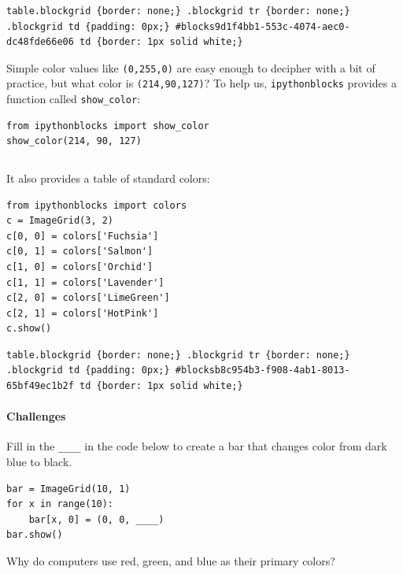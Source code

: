 \documentclass{book}
\begin{document}
\begin{verbatim}
table.blockgrid {border: none;} .blockgrid tr {border: none;} .blockgrid td {padding: 0px;} #blocks9d1f4bb1-553c-4074-aec0-dc48fde66e06 td {border: 1px solid white;}
\end{verbatim}

Simple color values like \texttt{(0,255,0)} are easy enough to decipher
with a bit of practice, but what color is \texttt{(214,90,127)}? To help
us, \texttt{ipythonblocks} provides a function called
\texttt{show\_color}:

\begin{verbatim}
from ipythonblocks import show_color
show_color(214, 90, 127)
\end{verbatim}

\begin{verbatim}
\end{verbatim}

It also provides a table of standard colors:

\begin{verbatim}
from ipythonblocks import colors
c = ImageGrid(3, 2)
c[0, 0] = colors['Fuchsia']
c[0, 1] = colors['Salmon']
c[1, 0] = colors['Orchid']
c[1, 1] = colors['Lavender']
c[2, 0] = colors['LimeGreen']
c[2, 1] = colors['HotPink']
c.show()
\end{verbatim}

\begin{verbatim}
table.blockgrid {border: none;} .blockgrid tr {border: none;} .blockgrid td {padding: 0px;} #blocksb8c954b3-f908-4ab1-8013-65bf49ec1b2f td {border: 1px solid white;}
\end{verbatim}

\mbox{}\paragraph{Challenges}

\begin{swcenumerate}
\item
  Fill in the \texttt{\_\_\_\_} in the code below to create a bar that
  changes color from dark blue to black.

\begin{verbatim}
bar = ImageGrid(10, 1)
for x in range(10):
    bar[x, 0] = (0, 0, ____)
bar.show()
\end{verbatim}
\item
  Why do computers use red, green, and blue as their primary colors?
\end{swcenumerate}
\end{document}
